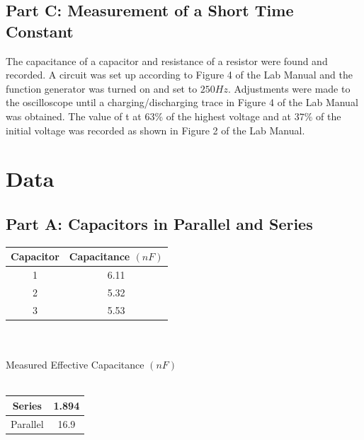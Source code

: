 \documentclass[titlepage]{article}
\begin{document}
\subsection{Part C: Measurement of a Short Time Constant}\label{sub:part_c_measurement_of_a_short_time_constant-proc}
The capacitance of a capacitor and resistance of a resistor were found and 
recorded.  A circuit was set up according to Figure 4 of the Lab Manual and the function 
generator was turned on and set to $250 Hz$.  Adjustments were made to the 
oscilloscope until a charging/discharging trace in Figure 4 of the Lab Manual was obtained. 
The value of t at $63\%$ of the highest voltage and at $37\%$ of the initial voltage 
was recorded as shown in Figure 2 of the Lab Manual.

\section{Data}\label{sec:data}
\subsection{Part A: Capacitors in Parallel and Series}\label{sub:part_a_capacitors_in_parallel_and_series-data}
\begin{tabular}{cc}
\hline
Capacitor & Capacitance $(nF)$\\
\hline
1 & 6.11\\
\hline
2 & 5.32\\
\hline
3 & 5.53\\
\hline
\end{tabular}\\
\\
Measured Effective Capacitance $(nF)$\\
\\
\begin{tabular}{cc}
\hline
Series & 1.894\\
\hline
Parallel & 16.9\\
\hline
\end{tabular}
\end{document}
